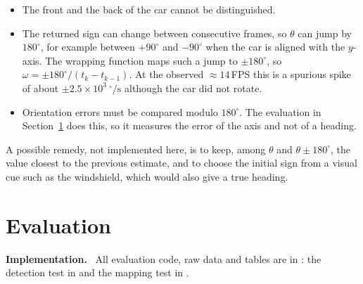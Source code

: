 \documentclass[10pt,a4paper]{article}
\newenvironment{impl}{\par\smallskip\noindent\footnotesize\textbf{Implementation.}\ }{\par\smallskip}
\begin{document}
\begin{itemize}\setlength{\itemsep}{0pt}
\item The front and the back of the car cannot be distinguished.
\item The returned sign can change between consecutive frames, so $\theta$
 can jump by $180^\circ$, for example between $+90^\circ$ and $-90^\circ$
 when the car is aligned with the $y$-axis.  The wrapping function maps such
 a jump to $\pm180^\circ$, so $\omega=\pm180^\circ/(t_k-t_{k-1})$.  At the
 observed $\approx14$\,FPS this is a spurious spike of about
 $\pm2.5\times10^{3}\ {}^\circ/\mathrm{s}$ although the car did not rotate.
\item Orientation errors must be compared modulo $180^\circ$.  The
 evaluation in Section~\ref{sec:eval} does this, so it measures the error of
 the axis and not of a heading.
\end{itemize}

\begin{center}
\label{fig:pca}
\end{center}

A possible remedy, not implemented here, is to keep, among $\theta$ and
$\theta\pm180^\circ$, the value closest to the previous estimate, and to
choose the initial sign from a visual cue such as the windshield, which would
also give a true heading.

\section{Evaluation}
\label{sec:eval}

\begin{impl}
All evaluation code, raw data and tables are in : the
detection test in  and the mapping test in
.
\end{impl}
\end{document}
